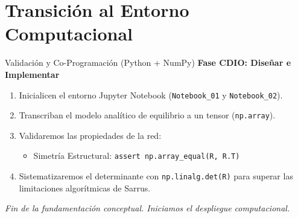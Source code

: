 \documentclass[aspectratio=169]{beamer}
\begin{document}
\section{Transición al Entorno Computacional}
\begin{frame}{Validación y Co-Programación (Python + NumPy)}
    \textbf{Fase CDIO: Diseñar e Implementar}
    \begin{enumerate}
        \item Inicialicen el entorno Jupyter Notebook (\texttt{Notebook\_01} y \texttt{Notebook\_02}).
        \item Transcriban el modelo analítico de equilibrio a un tensor (\texttt{np.array}).
        \item Validaremos las propiedades de la red:
        \begin{itemize}
            \item Simetría Estructural: \texttt{assert np.array\_equal(R, R.T)}
        \end{itemize}
        \item Sistematizaremos el determinante con \texttt{np.linalg.det(R)} para superar las limitaciones algorítmicas de Sarrus.
    \end{enumerate}
    
    \vspace{0.5cm}
    \begin{center}
        \textit{Fin de la fundamentación conceptual. Iniciamos el despliegue computacional.}
    \end{center}
\end{frame}
\end{document}
